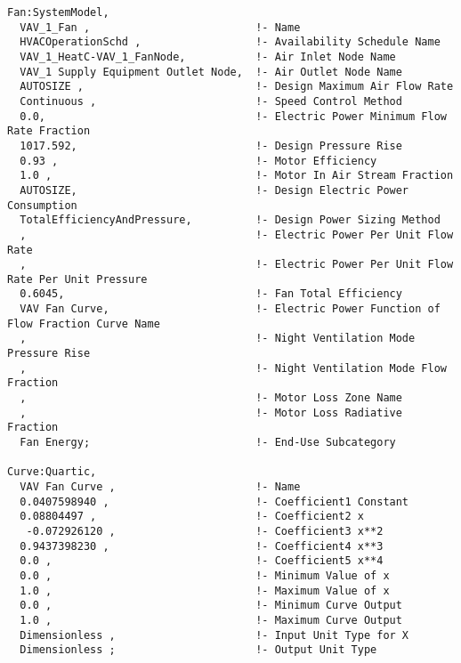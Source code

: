 \begin{lstlisting}
Fan:SystemModel,
  VAV_1_Fan ,                          !- Name
  HVACOperationSchd ,                  !- Availability Schedule Name
  VAV_1_HeatC-VAV_1_FanNode,           !- Air Inlet Node Name
  VAV_1 Supply Equipment Outlet Node,  !- Air Outlet Node Name
  AUTOSIZE ,                           !- Design Maximum Air Flow Rate
  Continuous ,                         !- Speed Control Method
  0.0,                                 !- Electric Power Minimum Flow Rate Fraction
  1017.592,                            !- Design Pressure Rise
  0.93 ,                               !- Motor Efficiency
  1.0 ,                                !- Motor In Air Stream Fraction
  AUTOSIZE,                            !- Design Electric Power Consumption
  TotalEfficiencyAndPressure,          !- Design Power Sizing Method
  ,                                    !- Electric Power Per Unit Flow Rate
  ,                                    !- Electric Power Per Unit Flow Rate Per Unit Pressure
  0.6045,                              !- Fan Total Efficiency 
  VAV Fan Curve,                       !- Electric Power Function of Flow Fraction Curve Name
  ,                                    !- Night Ventilation Mode Pressure Rise
  ,                                    !- Night Ventilation Mode Flow Fraction
  ,                                    !- Motor Loss Zone Name
  ,                                    !- Motor Loss Radiative Fraction
  Fan Energy;                          !- End-Use Subcategory

Curve:Quartic,
  VAV Fan Curve ,                      !- Name
  0.0407598940 ,                       !- Coefficient1 Constant
  0.08804497 ,                         !- Coefficient2 x
   -0.072926120 ,                      !- Coefficient3 x**2
  0.9437398230 ,                       !- Coefficient4 x**3
  0.0 ,                                !- Coefficient5 x**4
  0.0 ,                                !- Minimum Value of x
  1.0 ,                                !- Maximum Value of x
  0.0 ,                                !- Minimum Curve Output
  1.0 ,                                !- Maximum Curve Output
  Dimensionless ,                      !- Input Unit Type for X
  Dimensionless ;                      !- Output Unit Type


\end{lstlisting}
